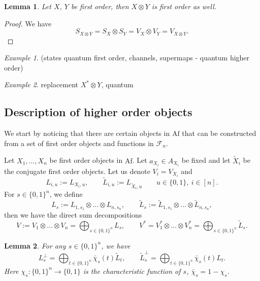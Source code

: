 \documentclass[12pt]{article}
\newtheorem{lemma}{Lemma}
\theoremstyle{definition}
\theoremstyle{remark}
\newtheorem{exm}{Example}
\def\Fe{\mathcal F}
\def \Af{\mathrm{Af}}
\begin{document}
\begin{lemma}\label{lemma:1ordertensor} Let $X$, $Y$ be first order, then $X\otimes Y$ is
first order as well.

\end{lemma}

\begin{proof} We have
\[
S_{X\otimes Y}=S_X\otimes S_Y=V_X\otimes V_Y=V_{X\otimes Y}.
\]

\end{proof}




\begin{exm} (states quantum first order, channels,  supermaps - quantum higher order)

\end{exm}






\begin{exm} replacement $X^*\otimes Y$, quantum
\end{exm}

\subsection{Description of higher order objects}


We start by noticing that there are certain objects in $\Af$ that can be constructed from
a set of  first order objects and functions in $\Fe_n$. 

Let $X_1,\dots,X_n$ be first order objects in $\Af$. Let $a_{X_i}\in A_{X_i}$ be fixed and
let $\tilde X_i$ be the conjugate first order objects. Let us denote $V_i=V_{X_i}$ and 
\[
L_{i,u}:= L_{X_i,u},\qquad  \tilde L_{i,u}:= L_{\tilde X_i,u} \qquad u\in \{0,1\},\ i\in [n].
\]
For $s\in \{0,1\}^n$, we define
\[
L_s:=L_{1,s_1}\otimes\dots \otimes L_{n,s_n}, \qquad \tilde L_s:=\tilde
L_{1,s_1}\otimes\dots \otimes \tilde L_{n,s_n},
\]
then we have the direct sum decompositions 
\[
V:=V_1\otimes \dots \otimes V_n=\bigoplus_{s\in \{0,1\}^n} L_s,\qquad V^*=V_1^*\otimes
\dots\otimes V_n^*=\bigoplus_{s\in \{0,1\}^n} \tilde L_s.
\]


\begin{lemma}\label{lemma:Lperp}   For any $s\in \{0,1\}^n$, we have 
\[
L_s^\perp=
\bigoplus_{t\in\{0,1\}^n} \bar{\chi}_s(t)\tilde L_t,\qquad \tilde L_s^\perp=
\bigoplus_{t\in\{0,1\}^n} \bar{\chi}_s(t)L_t.
\]
Here $\chi_s:\{0,1\}^n\to\{0,1\}$ is the characteristic function of $s$,
$\bar{\chi}_s=1-\chi_s$. 

\end{lemma}
\end{document}

